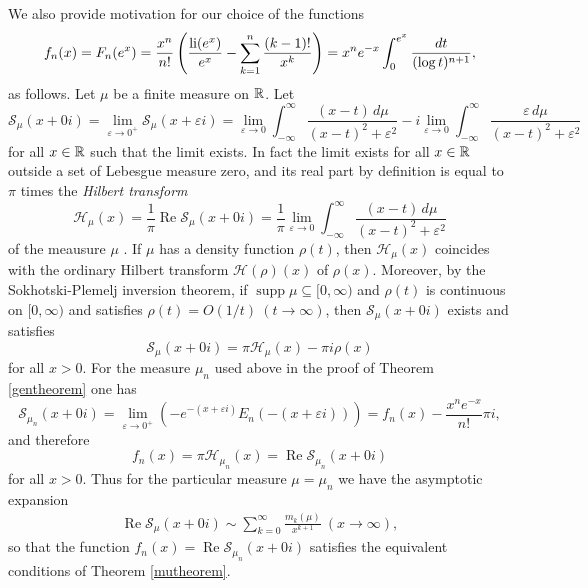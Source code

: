 \documentclass[12pt]{article}
\begin{document}
We  also provide motivation for our choice of the functions
\begin{align*}
f_n(x) = F_n(e^x)  = \frac{x^{n}}{n!}\left(\frac{\operatorname{li}(e^x)}{e^x} - \sum_{k = 1}^{n} \frac{(k-1)!}{x^{k}} \right) =  x^{n}{e^{-x}} \int_0^{e^x} \frac{dt} {(\log t)^{n+1}},
\end{align*}
as follows.  Let $\mu$ be a finite measure on ${\mathbb R}$.  Let
$${\mathcal S}_\mu(x+0i) = \lim_{\varepsilon \to 0^+}  {\mathcal S}_\mu(x+\varepsilon i)  = \lim_{\varepsilon \to 0} \int_{-\infty}^\infty \frac{(x-t) \, d \mu}{(x-t)^2+\varepsilon^2} - i \lim_{\varepsilon \to 0} \int_{-\infty}^\infty \frac{\varepsilon\, d \mu}{(x-t)^2+\varepsilon^2}$$
for all $x \in {\mathbb R}$ such that the limit exists.  In fact the limit exists for all $x \in {\mathbb R}$ outside a set of Lebesgue measure zero, and  its real part by definition is equal to $\pi$ times the {\it Hilbert transform} 
$${\mathcal H}_\mu(x) = \frac{1}{\pi}  \operatorname{Re} {\mathcal S}_\mu(x+0i)  = \frac{1}{\pi} \lim_{\varepsilon \to 0} \int_{-\infty}^\infty \frac{(x-t) \, d \mu}{(x-t)^2+\varepsilon^2}$$
of the meausure $\mu$ \cite{PSZ}.  If $\mu$ has a density function $\rho(t)$, then ${\mathcal H}_\mu(x)$ coincides with the ordinary Hilbert transform $\mathcal{H}(\rho)(x)$ of $\rho(x)$.  Moreover, by the Sokhotski-Plemelj inversion theorem, if $\operatorname{supp} \mu \subseteq [0,\infty)$ and $\rho(t)$ is continuous on $[0,\infty)$  and satisfies $\rho(t) = O(1/t) \ (t \to \infty)$, then ${\mathcal S}_\mu(x+0i)$ exists and satisfies
$${\mathcal S}_\mu(x+0i)  = \pi{\mathcal H}_\mu(x) -  \pi i\rho(x)$$
for all $x >0$.  For the measure $\mu_n$ used above in the proof of Theorem \ref{gentheorem} one has
$${\mathcal S}_{\mu_n}(x+0i)  = \lim_{\varepsilon \to 0^+}\left( -e^{-(x+\varepsilon i)}E_n(-(x+\varepsilon i)) \right) = f_n(x)- \frac{x^{n}e^{-x}}{n! }\pi i,$$
and therefore
$$f_n(x) =  \pi {\mathcal H}_{\mu_n}(x) = \operatorname{Re}{\mathcal S}_{\mu_n}(x+0i)$$
for all $x > 0$.  Thus for the particular measure $\mu = \mu_n$ we have the asymptotic expansion
\begin{align}\label{mun}
\operatorname{Re}{\mathcal S}_{\mu}(x+0i) \sim \sum_{k = 0}^\infty \frac{m_k(\mu)}{x^{k+1}} \ (x \to \infty),
\end{align}
so that the function $f_n(x) = \operatorname{Re}{\mathcal S}_{\mu_n}(x+0i)$ satisfies the equivalent conditions of Theorem \ref{mutheorem}. 
\end{document}
